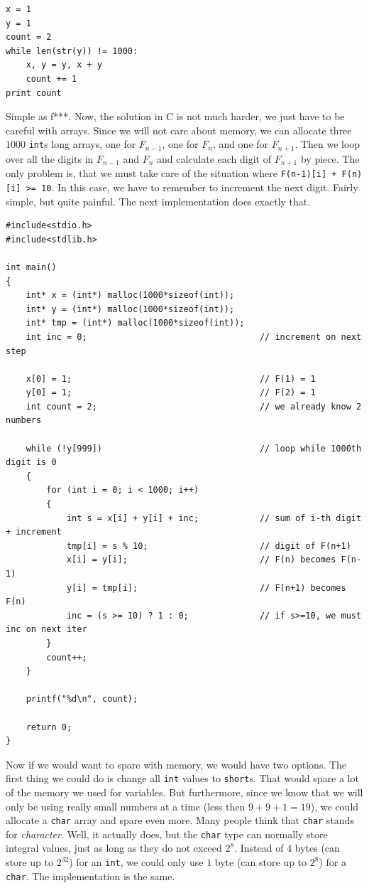 \documentclass{book}
\begin{document}
\begin{verbatim}
x = 1
y = 1
count = 2
while len(str(y)) != 1000:
    x, y = y, x + y
    count += 1
print count
\end{verbatim}

Simple as f***. Now, the solution in C is not much harder, we just have to be careful with arrays. Since we will not care about memory, we can allocate three $1000$ \texttt{int}s long arrays, one for $F_{n-1}$, one for $F_n$, and one for $F_{n+1}$. Then we loop over all the digits in $F_{n-1}$ and $F_n$ and calculate each digit of $F_{n+1}$ by piece. The only problem is, that we must take care of the situation where \texttt{F(n-1)[i] + F(n)[i] >= 10}. In this case, we have to remember to increment the next digit. Fairly simple, but quite painful. The next implementation does exactly that.

\begin{verbatim}
#include<stdio.h>
#include<stdlib.h>

int main()
{
    int* x = (int*) malloc(1000*sizeof(int));
    int* y = (int*) malloc(1000*sizeof(int));
    int* tmp = (int*) malloc(1000*sizeof(int));
    int inc = 0;                                  // increment on next step

    x[0] = 1;                                     // F(1) = 1
    y[0] = 1;                                     // F(2) = 1
    int count = 2;                                // we already know 2 numbers

    while (!y[999])                               // loop while 1000th digit is 0
    {
        for (int i = 0; i < 1000; i++)
        {
            int s = x[i] + y[i] + inc;            // sum of i-th digit + increment
            tmp[i] = s % 10;                      // digit of F(n+1)
            x[i] = y[i];                          // F(n) becomes F(n-1)
            y[i] = tmp[i];                        // F(n+1) becomes F(n)
            inc = (s >= 10) ? 1 : 0;              // if s>=10, we must inc on next iter
        }
        count++;
    }

    printf("%d\n", count);

    return 0;
}
\end{verbatim}

Now if we would want to spare with memory, we would have two options. The first thing we could do is change all \texttt{int} values to \texttt{short}s. That would spare a lot of the memory we used for variables. But furthermore, since we know that we will only be using really small numbers at a time (less then $9+9+1 = 19$), we could allocate a \texttt{char} array and spare even more. Many people think that \texttt{char} stands for \textit{character}. Well, it actually does, but the \texttt{char} type can normally store integral values, just as long as they do not exceed $2^8$. Instead of $4$ bytes (can store up to $2^{32}$) for an \texttt{int}, we could only use $1$ byte (can store up to $2^8$) for a \texttt{char}. The implementation is the same.
\end{document}

